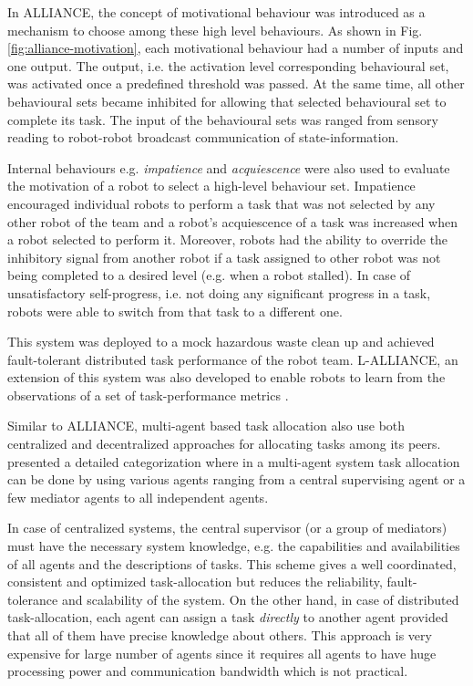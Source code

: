 In ALLIANCE, the concept of motivational behaviour was introduced  as a mechanism to choose among these high level behaviours. As shown in Fig. \ref{fig:alliance-motivation}, each motivational behaviour had a number of inputs and one output. The output, i.e. the activation level corresponding behavioural set, was activated once a predefined threshold was passed. At the same time, all other behavioural sets became inhibited for allowing that selected behavioural set to complete its task. The input of the behavioural sets was ranged from sensory reading to robot-robot broadcast communication of state-information. 

Internal behaviours e.g. {\em impatience}  and {\em acquiescence} were also used to evaluate the motivation of a robot to select a high-level behaviour set.  Impatience encouraged individual robots to perform a task that was not selected by any other robot of the team and a robot's acquiescence of a task was increased when a robot selected to perform it.  Moreover, robots had the ability to override the inhibitory signal from another robot if a task assigned to other robot was not being completed to a desired level (e.g. when a robot stalled). In case of unsatisfactory self-progress, i.e. not doing any significant progress in a task, robots were able to switch from that task to a different one. 

This system was deployed to a mock hazardous waste clean up and achieved fault-tolerant distributed task performance of the robot team. L-ALLIANCE, an extension of this system was also developed to enable robots  to learn from the observations of a set of task-performance metrics \cite{Parker1995}. 

Similar to  ALLIANCE, multi-agent based task allocation also  use both centralized and decentralized approaches for allocating tasks among  its  peers.  presented a detailed categorization where in a multi-agent system task allocation can be done by using various agents ranging from a central supervising agent or a few mediator agents to  all independent agents. 

In case of centralized systems, the central supervisor (or a group of mediators)  must have the necessary system knowledge, e.g. the capabilities and availabilities of all agents and the descriptions of tasks. This scheme gives a well coordinated, consistent and optimized task-allocation but reduces  the reliability, fault-tolerance and scalability of the system. On the other hand, in case of distributed task-allocation, each agent can assign a task {\em directly} to another agent provided that all of them have precise knowledge about others. This approach is very expensive for large number of agents since it requires all agents to have huge processing power and communication bandwidth which is not practical.

